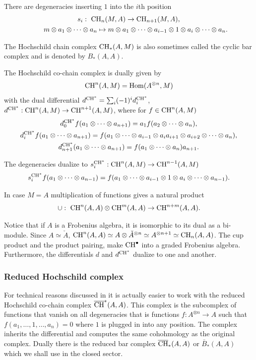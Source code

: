 \documentclass[pdftex]{sigma}
\def\oto{\otimes \dots \otimes}
\newcommand{\aoa}[2]{a_{#1}\otimes \dots \otimes a_{#2}}
\def\d{d^{{\rm CH}^*}}
\def\s{s^{{\rm CH}^*}}
\begin{document}
There are degeneracies inserting $1$ into the $i$th position
\begin{gather*}
s_i: \ {\rm CH}_n(M,A) \to {\rm CH}_{n+1}(M,A),\\
\phantom{s_i:}{} \ \ m\otimes a_1 \oto a_n \mapsto m\otimes a_1
\oto a_{i-1}\otimes  1 \otimes a_i \oto a_n.
\end{gather*}

The Hochschild chain complex ${\rm CH}_*(A,M)$ is also sometimes called
the cyclic bar complex and is denoted by $B_*(A,A)$.


The Hochschild co-chain complex is dually given by
\[
{\rm CH}^n(A,M)={\rm Hom}(A^{\otimes n},M)
\]
with the dual dif\/ferential $\d=\sum_i (-1)^i \d_i$,
$\d:{\rm CH}^n(A,M)\to {\rm CH}^{n+1}(A,M)$, where for $f\in {\rm CH}^n(A,M)$
\begin{gather*}
\d_0 f( a_1 \oto a_{n+1} ) =  a_1f(\aoa{2}{n}),\\
\d_i f(a_1 \oto a_{n+1}) = f(\aoa{1}{i-1}\otimes a_{i}a_{i+1}\otimes
\aoa{i+2}{n}), \\
\d_{n+1} ( a_1 \oto a_{n+1}) = f(\aoa{1}{n})a_{n+1}.
\end{gather*}

The degeneracies dualize to $\s_i:{\rm CH}^n(A,M)\to {\rm CH}^{n-1}(A,M)$
\begin{equation*}
\s_i f(a_1 \oto a_{n-1})=f(\aoa{1}{i-1}\otimes 1\otimes
\aoa{i}{n-1}).
\end{equation*}


In case $M=A$ multiplication of functions gives a natural product
\[
\cup: \ {\rm CH}^n(A,A)\otimes {\rm CH}^m(A,A)\to {\rm CH}^{n+m}(A,A).
\]


Notice that if $A$ is a Frobenius algebra, it is isomorphic to its
dual as a bi-module. Since $A\simeq {\check A}$, ${\rm CH}^n(A,A)\simeq
A\otimes {\check A}^{\otimes n}\simeq A^{\otimes n+1}\simeq
{\rm CH}_n(A,A)$. The cup product  and the product pairing, make
${\rm CH}^{\bullet}$ into a graded Frobenius algebra. Furthermore, the
dif\/ferentials  $d$ and $\d$ dualize to one and another.

\subsubsection{Reduced Hochschild complex}

For technical reasons discussed in \cite{hoch2} it is actually
easier to work with the reduced Hochschild co-chain complex
$\overline{\rm CH}^*(A,A)$. This complex is the subcomplex of functions
that vanish on all degeneracies that is functions $f:A^{\otimes
n}\to A$ such that $f(a_1,\dots,1,\dots, a_n)=0$ where $1$ is
plugged in into any position. The complex inherits the dif\/ferential
and computes the same cohohmology as the original complex. Dually
there is the reduced bar complex $\overline {\rm CH}_*(A,A)$ or $\bar
B_*(A,A)$ which we shall use in the closed sector.
\end{document}
